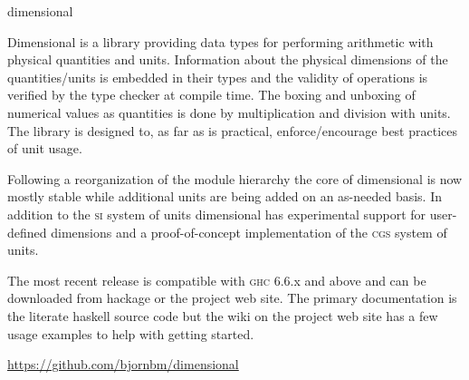\begin{hcarentry}{dimensional}
\label{dimensional}
\makeheader

Dimensional is a library providing data types for performing
arithmetic with physical quantities and units. Information about
the physical dimensions of the quantities/units is embedded in their
types and the validity of operations is verified by the type checker
at compile time. The boxing and unboxing of numerical values as
quantities is done by multiplication and division with units. The
library is designed to, as far as is practical, enforce/encourage
best practices of unit usage.

Following a reorganization of the module hierarchy the core of
dimensional is now mostly stable while additional units are being
added on an as-needed basis. In addition to the \textsc{si} system
of units dimensional has experimental support for user-defined
dimensions and a proof-of-concept implementation of the \textsc{cgs}
system of units.

The most recent release is compatible with \textsc{ghc} 6.6.x and
above and can be downloaded from hackage or the project web site.
The primary documentation is the literate haskell source code but
the wiki on the project web site has a few usage examples to help
with getting started.

\FurtherReading
 \url{https://github.com/bjornbm/dimensional}
\end{hcarentry}

